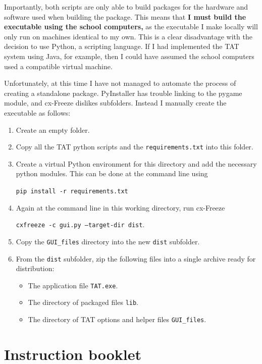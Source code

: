 \documentclass[10pt]{article}
\begin{document}
Importantly, both scripts are only able to build packages for the hardware and software used when building the package. This means that \textbf{I must build the executable using the school computers,} as the executable I make locally will only run on machines identical to my own. This is a clear disadvantage with the decision to use Python, a scripting language. If I had implemented the TAT system using Java, for example, then I could have assumed the school computers used a compatible virtual machine.

Unfortunately, at this time I have not managed to automate the process of creating a standalone package. PyInstaller has trouble linking to the pygame module, and cx-Freeze dislikes subfolders. Instead I manually create the executable as follows:

\begin{enumerate}
\item Create an empty folder.
\item Copy all the TAT python scripts and the \texttt{requirements.txt} into this folder.
\item Create a virtual Python environment for this directory and add the necessary python modules. This can be done at the command line using

\texttt{pip install -r requirements.txt}

\item Again at the command line in this working directory, run cx-Freeze

\texttt{cxfreeze -c gui.py --target-dir dist}.

\item Copy the \texttt{GUI\_files} directory into the new \texttt{dist} subfolder.
\item From the \texttt{dist} subfolder, zip the following files into a single archive ready for distribution:
\begin{itemize}
\item The application file \texttt{TAT.exe}.
\item The directory of packaged files \texttt{lib}.
\item The directory of TAT options and helper files \texttt{GUI\_files}.
\end{itemize}
\end{enumerate}

\newpage
\section{Instruction booklet} \label{instructions} 
\end{document}
